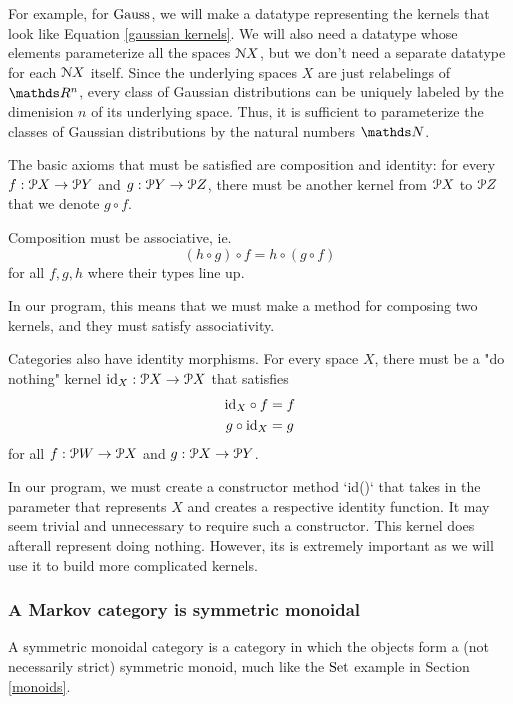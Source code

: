 For example, for $\mathrm{Gauss}$, we will make a datatype representing the kernels that look like Equation \ref{gaussian kernels}.
We will also need a datatype whose elements parameterize all the spaces $\mathcal{N} X$, but we don't need a separate datatype for each $\mathcal{N} X$ itself.
Since the underlying spaces $X$ are just relabelings of $\reals^n$, every class of Gaussian distributions can be uniquely labeled by the dimenision $n$ of its underlying space.
Thus, it is sufficient to parameterize the classes of Gaussian distributions by the natural numbers $\naturals$.

The basic axioms that must be satisfied are composition and identity:
for every $f:\mathcal{P} X \rightarrow \mathcal{P} Y$ and $g:\mathcal{P} Y \rightarrow \mathcal{P} Z$, there must be another kernel from $\mathcal{P} X$ to $\mathcal{P} Z$ that we denote $g\circ f$.

Composition must be associative, ie.
\begin{equation}
	(h\circ g)\circ f = h\circ (g\circ f)
\end{equation}
for all $f,g,h$ where their types line up.

In our program, this means that we must make a method for composing two kernels, and they must satisfy associativity.

Categories also have identity morphisms.
For every space $X$, there must be a "do nothing" kernel $\mathrm{id}_X : \mathcal{P} X \rightarrow \mathcal{P} X$ that satisfies
\begin{align}
	\mathrm{id}_X \circ f &= f\\
	g\circ \mathrm{id}_X &= g
\end{align}
for all $f:\mathcal{P} W\rightarrow \mathcal{P} X$ and $g:\mathcal{P} X\rightarrow \mathcal{P} Y$.

In our program, we must create a constructor method `id()` that takes in the parameter that represents $X$ and creates a respective identity function.
It may seem trivial and unnecessary to require such a constructor.
This kernel does afterall represent doing nothing.
However, its is extremely important as we will use it to build more complicated kernels.

\subsubsection{A Markov category is symmetric monoidal}

A symmetric monoidal category is a category in which the objects form a (not necessarily strict) symmetric monoid, much like the $\mathrm{Set}$ example in Section \ref{monoids}.

